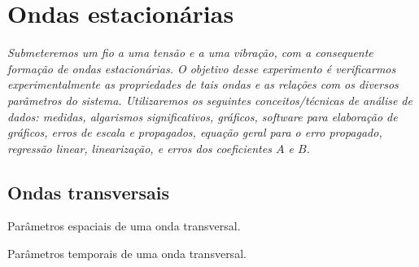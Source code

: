 \chapter{Ondas estacionárias}
\label{Chap:ExpOndasEstacionarias}

\begin{fullwidth}\it
Submeteremos um fio a uma tensão e a uma vibração, com a consequente formação de ondas estacionárias. O objetivo desse experimento é verificarmos experimentalmente as propriedades de tais ondas e as relações com os diversos parâmetros do sistema. Utilizaremos os seguintes conceitos/técnicas de análise de dados: medidas, algarismos significativos, gráficos, software para elaboração de gráficos, erros de escala e propagados, equação geral para o erro propagado, regressão linear, linearização, e erros dos coeficientes $A$ e $B$.
\end{fullwidth}

\section{Ondas transversais}

\begin{marginfigure}[5cm]
\centering
{}
\caption{Parâmetros espaciais de uma onda transversal.}
\label{Fig:OndaCongelada}
\end{marginfigure}

\begin{marginfigure}
\centering
{}
\caption{Parâmetros temporais de uma onda transversal.}
\label{Fig:OscilacaoPontoOnda}
\end{marginfigure}

